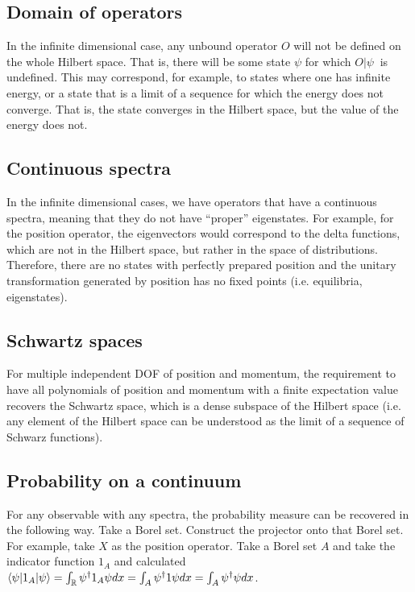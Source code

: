 \subsection{Domain of operators}

In the infinite dimensional case, any unbound operator $O$ will not be defined on the whole Hilbert space. That is, there will be some state $\psi$ for which $O |\psi\>$ is undefined. This may correspond, for example, to states where one has infinite energy, or a state that is a limit of a sequence for which the energy does not converge. That is, the state converges in the Hilbert space, but the value of the energy does not.

\subsection{Continuous spectra}

In the infinite dimensional cases, we have operators that have a continuous spectra, meaning that they do not have ``proper'' eigenstates. For example, for the position operator, the eigenvectors would correspond to the delta functions, which are not in the Hilbert space, but rather in the space of distributions. Therefore, there are no states with perfectly prepared position and the unitary transformation generated by position has no fixed points (i.e. equilibria, eigenstates).


\subsection{Schwartz spaces}

For multiple independent DOF of position and momentum, the requirement to have all polynomials of position and momentum with a finite expectation value recovers the Schwartz space, which is a dense subspace of the Hilbert space (i.e. any element of the Hilbert space can be understood as the limit of a sequence of Schwarz functions).


\subsection{Probability on a continuum}


For any observable with any spectra, the probability measure can be recovered in the following way. Take a Borel set. Construct the projector onto that Borel set. For example, take $X$ as the position operator. Take a Borel set $A$ and take the indicator function $1_A$ and calculated $\langle \psi | 1_A | \psi \rangle = \int_{\mathbb{R}} \psi^\dagger 1_A \psi dx = \int_{A} \psi^\dagger 1 \psi dx = \int_{A} \psi^\dagger \psi dx$.

